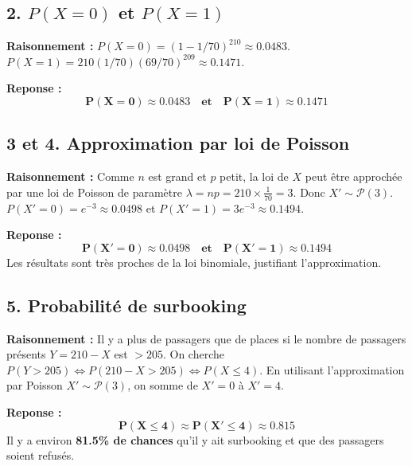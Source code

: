 \documentclass[11pt,a4paper]{article}
\begin{document}
\subsection*{2. $P(X=0)$ et $P(X=1)$}

\textbf{Raisonnement :} 
$P(X=0) = (1 - 1/70)^{210} \approx 0.0483$.
$P(X=1) = 210 (1/70) (69/70)^{209} \approx 0.1471$.

\textbf{Reponse :} 
$$
\mathbf{P(X=0) \approx 0.0483 \quad \text{et} \quad P(X=1) \approx 0.1471}
$$

\subsection*{3 et 4. Approximation par loi de Poisson}

\textbf{Raisonnement :} Comme $n$ est grand et $p$ petit, la loi de $X$ peut être approchée par une loi de Poisson de paramètre $\lambda = np = 210 \times \frac{1}{70} = 3$. Donc $X' \sim \mathcal{P}(3)$.
$P(X'=0) = e^{-3} \approx 0.0498$ et $P(X'=1) = 3e^{-3} \approx 0.1494$.

\textbf{Reponse :} 
$$
\mathbf{P(X'=0) \approx 0.0498 \quad \text{et} \quad P(X'=1) \approx 0.1494}
$$
Les résultats sont très proches de la loi binomiale, justifiant l'approximation.

\subsection*{5. Probabilité de surbooking}

\textbf{Raisonnement :} Il y a plus de passagers que de places si le nombre de passagers présents $Y = 210 - X$ est $> 205$. 
On cherche $P(Y > 205) \iff P(210 - X > 205) \iff P(X \le 4)$.
En utilisant l'approximation par Poisson $X' \sim \mathcal{P}(3)$, on somme de $X'=0$ à $X'=4$.

\textbf{Reponse :} 
$$
\mathbf{P(X \le 4) \approx P(X' \le 4) \approx 0.815}
$$
Il y a environ \textbf{81.5\% de chances} qu'il y ait surbooking et que des passagers soient refusés.
\end{document}
